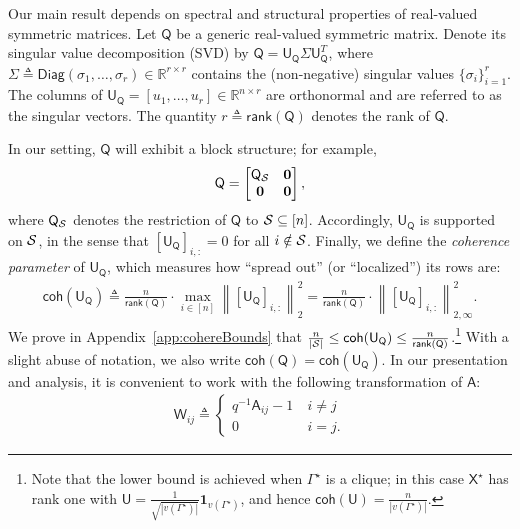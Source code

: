 \documentclass[12pt]{article}
\newcommand{\calS}{{\cal S}}
\newcommand{\norm}[1]{\left\|#1\right\|}
\newcommand{\s}[1]{\mathsf{#1}}
\begin{document}
Our main result depends on spectral and structural properties of real-valued symmetric matrices. Let $\s{Q}$ be a generic real-valued symmetric matrix. Denote its singular value decomposition (SVD) by $\s{Q} = \s{U}_{\s{Q}} \Sigma \s{U}_{\s{Q}}^T$, where $\Sigma \triangleq \s{Diag}(\sigma_1, \ldots, \sigma_r) \in \mathbb{R}^{r \times r}$ contains the (non-negative) singular values $\{\sigma_i\}_{i=1}^r$. The columns of $\s{U}_{\s{Q}} = [u_1, \ldots, u_r] \in \mathbb{R}^{n \times r}$ are orthonormal and are referred to as the singular vectors. The quantity $r \triangleq \s{rank}(\s{Q})$ denotes the rank of $\s{Q}$.

In our setting, $\s{Q}$ will exhibit a block structure; for example,
\begin{align}
\s{Q} =
\begin{bmatrix}
\s{Q}_\calS & \mathbf{0} \\
\mathbf{0} & \mathbf{0}
\end{bmatrix},
\end{align}
where $\s{Q}_\calS$ denotes the restriction of $\s{Q}$ to $\calS\subseteq[n]$. Accordingly, $\mathsf{U}_{\s{Q}}$ is supported on $\calS$, in the sense that $[\mathsf{U}_{\s{Q}}]_{i,:} = 0$ for all $i \notin\calS$. Finally, we define the \emph{coherence parameter} of $\s{U}_{\s{Q}}$, which measures how ``spread out'' (or ``localized'') its rows are:
\begin{align}
    \s{coh}(\s{U}_{\s{Q}})\triangleq\frac{n}{\s{rank}(\s{Q})}\cdot\max_{i\in[n]}\norm{[\mathsf{U}_{\s{Q}}]_{i,:}}_2^2 = \frac{n}{\s{rank}(\s{Q})}\cdot\norm{[\mathsf{U}_{\s{Q}}]_{i,:}}_{2,\infty}^2.
\end{align}
We prove in Appendix~\ref{app:cohereBounds} that $\frac{n}{|\calS|}\leq \s{coh}(\s{U}_{\s{Q}})\leq \frac{n}{\s{rank}(\s{Q})}$.\footnote{Note that the lower bound is achieved when $\Gamma^\star$ is a clique; in this case $\s{X}^\star$ has rank one with $\s{U} = \frac{1}{\sqrt{|v(\Gamma^\star)|}}\mathbf{1}_{v(\Gamma^\star)}$, and hence $\s{coh}(\s{U}) = \frac{n}{|v(\Gamma^\star)|}$.} With a slight abuse of notation, we also write $\s{coh}(\s{Q}) = \s{coh}(\s{U}_{\s{Q}})$. In our presentation and analysis, it is convenient to work with the following transformation of $\s{A}$:
\begin{align}
\s{W}_{ij}\triangleq\begin{cases}
q^{-1}\s{A}_{ij}-1\ &i\neq j\\
0\ &i=j.
\end{cases}\label{eqn:centeredform}
\end{align}
\end{document}
